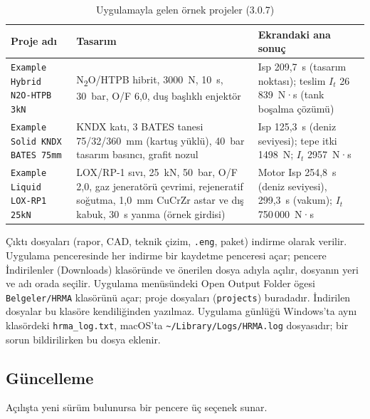 \documentclass[11pt,a4paper]{article}
\newcommand{\ui}[1]{\textsf{#1}}
\newcommand{\kod}[1]{\texttt{#1}}
\begin{document}
\begin{table}[htbp]
\centering\small
\caption{Uygulamayla gelen örnek projeler (3.0.7)}\label{tab:ornekler}
\begin{tabular}{@{}>{\raggedright\arraybackslash}p{4.6cm}>{\raggedright\arraybackslash}p{6.6cm}>{\raggedright\arraybackslash}p{4.4cm}@{}}
\toprule
\textbf{Proje adı} & \textbf{Tasarım} & \textbf{Ekrandaki ana sonuç} \\
\midrule
\kod{Example Hybrid N2O-HTPB 3kN} & N\textsubscript{2}O/HTPB hibrit, 3000~N, 10~s, 30~bar, O/F 6,0, duş başlıklı enjektör & Isp 209,7~s (tasarım noktası); teslim $I_t$ 26\,839~N·s (tank boşalma çözümü) \\
\kod{Example Solid KNDX BATES 75mm} & KNDX katı, 3 BATES tanesi 75/32/360~mm (kartuş yüklü), 40~bar tasarım basıncı, grafit nozul & Isp 125,3~s (deniz seviyesi); tepe itki 1498~N; $I_t$ 2957~N·s \\
\kod{Example Liquid LOX-RP1 25kN} & LOX/RP-1 sıvı, 25~kN, 50~bar, O/F 2,0, gaz jeneratörü çevrimi, rejeneratif soğutma, 1,0~mm CuCrZr astar ve dış kabuk, 30~s yanma (örnek girdisi) & Motor Isp 254,8~s (deniz seviyesi), 299,3~s (vakum); $I_t$ 750\,000~N·s \\
\bottomrule
\end{tabular}
\end{table}

Çıktı dosyaları (rapor, CAD, teknik çizim, \kod{.eng}, paket) indirme
olarak verilir. Uygulama penceresinde her indirme bir kaydetme penceresi açar;
pencere İndirilenler (Downloads) klasöründe ve önerilen dosya adıyla açılır,
dosyanın yeri ve adı orada seçilir. Uygulama menüsündeki \ui{Open Output
Folder} ögesi \kod{Belgeler/\allowbreak{}HRMA} klasörünü açar; proje dosyaları
(\kod{projects}) buradadır. İndirilen dosyalar bu klasöre kendiliğinden
yazılmaz. Uygulama günlüğü Windows'ta aynı klasördeki
\kod{hrma\_\allowbreak{}log.txt}, macOS'ta
\kod{\textasciitilde/\allowbreak{}Library/\allowbreak{}Logs/\allowbreak{}HRMA.log} dosyasıdır; bir sorun
bildirilirken bu dosya eklenir.

\subsection{Güncelleme}\label{sec:guncelleme}

Açılışta yeni sürüm bulunursa bir pencere üç seçenek sunar.
\end{document}
